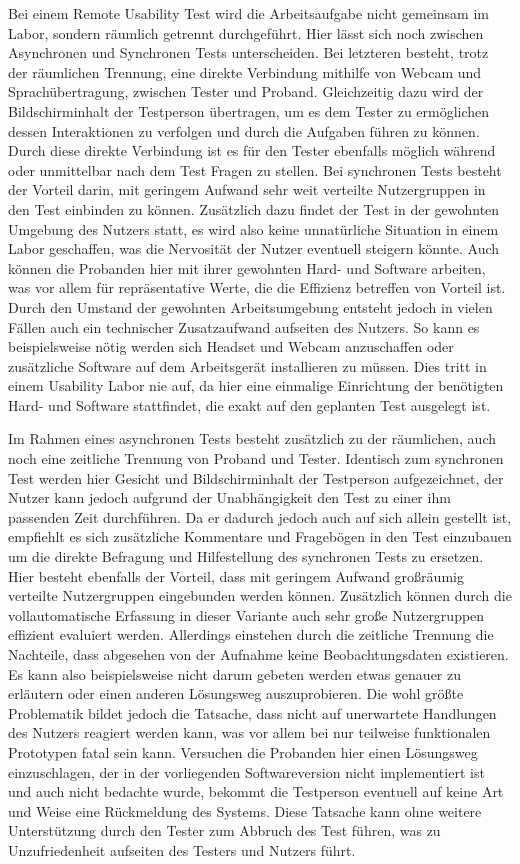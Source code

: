 Bei einem Remote Usability Test wird die Arbeitsaufgabe nicht gemeinsam im Labor, sondern räumlich getrennt durchgeführt.
Hier lässt sich noch zwischen Asynchronen und Synchronen Tests unterscheiden.
Bei letzteren besteht, trotz der räumlichen Trennung, eine direkte Verbindung mithilfe von Webcam und Sprachübertragung, zwischen Tester und Proband.
Gleichzeitig dazu wird der Bildschirminhalt der Testperson übertragen, um es dem Tester zu ermöglichen dessen Interaktionen zu verfolgen und durch die Aufgaben führen zu können.
Durch diese direkte Verbindung ist es für den Tester ebenfalls möglich während oder unmittelbar nach dem Test Fragen zu stellen.
Bei synchronen Tests besteht der Vorteil darin, mit geringem Aufwand sehr weit verteilte Nutzergruppen in den Test einbinden zu können.
Zusätzlich dazu findet der Test in der gewohnten Umgebung des Nutzers statt, es wird also keine unnatürliche Situation in einem Labor geschaffen, was die Nervosität der Nutzer eventuell steigern könnte.
Auch können die Probanden hier mit ihrer gewohnten Hard- und Software arbeiten, was vor allem für repräsentative Werte, die die Effizienz betreffen von Vorteil ist.
Durch den Umstand der gewohnten Arbeitsumgebung entsteht jedoch in vielen Fällen auch ein technischer Zusatzaufwand aufseiten des Nutzers.
So kann es beispielsweise nötig werden sich Headset und Webcam anzuschaffen oder zusätzliche Software auf dem Arbeitsgerät installieren zu müssen.
Dies tritt in einem Usability Labor nie auf, da hier eine einmalige Einrichtung der benötigten Hard- und Software stattfindet, die exakt auf den geplanten Test ausgelegt ist.

Im Rahmen eines asynchronen Tests besteht zusätzlich zu der räumlichen, auch noch eine zeitliche Trennung von Proband und Tester.
Identisch zum synchronen Test werden hier Gesicht und Bildschirminhalt der Testperson aufgezeichnet, der Nutzer kann jedoch aufgrund der Unabhängigkeit den Test zu einer ihm passenden Zeit durchführen.
Da er dadurch jedoch auch auf sich allein gestellt ist, empfiehlt es sich zusätzliche Kommentare und Fragebögen in den Test einzubauen um die direkte Befragung und Hilfestellung des synchronen Tests zu ersetzen.
Hier besteht ebenfalls der Vorteil, dass mit geringem Aufwand großräumig verteilte Nutzergruppen eingebunden werden können.
Zusätzlich können durch die vollautomatische Erfassung in dieser Variante auch sehr große Nutzergruppen effizient evaluiert werden.
Allerdings einstehen durch die zeitliche Trennung die Nachteile, dass abgesehen von der Aufnahme keine Beobachtungsdaten existieren.
Es kann also beispielsweise nicht darum gebeten werden etwas genauer zu erläutern oder einen anderen Lösungsweg auszuprobieren.
Die wohl größte Problematik bildet jedoch die Tatsache, dass nicht auf unerwartete Handlungen des Nutzers reagiert werden kann, was vor allem bei nur teilweise funktionalen Prototypen fatal sein kann.
Versuchen die Probanden hier einen Lösungsweg einzuschlagen, der in der vorliegenden Softwareversion nicht implementiert ist und auch nicht bedachte wurde, bekommt die Testperson eventuell auf keine Art und Weise eine Rückmeldung des Systems.
Diese Tatsache kann ohne weitere Unterstützung durch den Tester zum Abbruch des Test führen, was zu Unzufriedenheit aufseiten des Testers und Nutzers führt.\cite{Sarodnick.2016}

